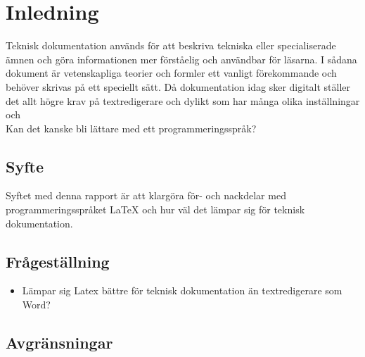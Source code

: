 \section{Inledning}
Teknisk dokumentation används för att beskriva tekniska eller specialiserade ämnen och göra informationen mer förståelig och användbar för läsarna. I sådana dokument är vetenskapliga teorier och formler ett vanligt förekommande och behöver skrivas på ett speciellt sätt. Då dokumentation idag sker digitalt ställer det allt högre krav på textredigerare och dylikt som har många olika inställningar och
\\
Kan det kanske bli lättare med ett programmeringsspråk?          


\subsection{Syfte}
Syftet med denna rapport är att klargöra för- och nackdelar med programmeringsspråket {\LaTeX} och hur väl det lämpar sig för teknisk dokumentation.  

\subsection{Frågeställning}
\begin{itemize} 
\item Lämpar sig Latex bättre för teknisk dokumentation än textredigerare som Word?
\end{itemize}
		
\subsection{Avgränsningar}


	